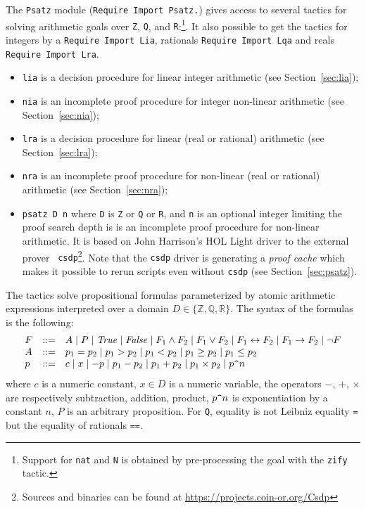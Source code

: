 \newtheorem{theorem}{Theorem}

 
       
\label{sec:psatz-hurry}
The {\tt Psatz} module ({\tt Require Import Psatz.}) gives access to
several tactics for solving arithmetic goals over {\tt Z}, {\tt Q}, and
{\tt R}:\footnote{Support for {\tt nat} and {\tt N} is obtained by
  pre-processing the goal with the {\tt zify} tactic.}.
It also possible to get the tactics for integers by a {\tt Require Import Lia}, rationals {\tt Require Import Lqa} 
and reals {\tt Require Import Lra}.
\begin{itemize}
\item {\tt lia} is a decision procedure for linear integer arithmetic (see Section~\ref{sec:lia});
\item {\tt nia} is an incomplete proof procedure for integer non-linear arithmetic (see Section~\ref{sec:nia});
\item {\tt lra} is a decision procedure for linear (real or rational) arithmetic  (see Section~\ref{sec:lra});
\item {\tt nra} is an incomplete proof procedure for non-linear (real or rational) arithmetic  (see Section~\ref{sec:nra});
\item {\tt psatz D n} where {\tt D} is {\tt Z} or {\tt Q} or {\tt R}, and
  {\tt n} is an optional integer limiting the proof search depth is is an
  incomplete proof procedure for non-linear arithmetic. It is based on
  John Harrison's HOL Light driver to the external prover {\tt
    csdp}\footnote{Sources and binaries can be found at
    \url{https://projects.coin-or.org/Csdp}}. Note that the {\tt csdp}
  driver is generating a \emph{proof cache} which makes it possible to
  rerun scripts even without {\tt csdp} (see Section~\ref{sec:psatz}).
\end{itemize}

The tactics solve propositional formulas parameterized by atomic arithmetic expressions
interpreted over a domain $D \in \{\mathbb{Z}, \mathbb{Q}, \mathbb{R} \}$.
The syntax of the formulas is the following:
\[
\begin{array}{lcl}
 F &::=&  A \mid P \mid \mathit{True} \mid \mathit{False} \mid F_1 \land F_2 \mid F_1 \lor F_2 \mid F_1 \leftrightarrow F_2 \mid F_1 \to F_2 \mid \neg F\\
 A &::=& p_1 = p_2 \mid  p_1 > p_2 \mid p_1 < p_2 \mid p_1 \ge p_2 \mid p_1 \le p_2 \\
 p &::=& c \mid x \mid {-}p \mid p_1 - p_2 \mid p_1 + p_2 \mid p_1 \times p_2 \mid p \verb!^! n
\end{array}
\]
where $c$ is a numeric constant, $x\in D$ is a numeric variable, the
operators $-$, $+$, $\times$ are respectively subtraction, addition,
product, $p \verb!^!n $ is exponentiation by a constant $n$, $P$ is an
arbitrary proposition.
 For {\tt Q}, equality is not Leibniz equality {\tt =} but the equality of rationals {\tt ==}.

